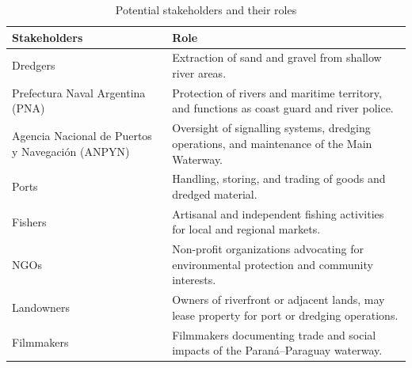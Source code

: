 \begin{table}[H]
\centering
\caption{Potential stakeholders and their roles}
\begin{tabularx}{\linewidth}{p{3.5cm}X} %
\toprule
Stakeholders & Role \\
\midrule
Dredgers & Extraction of sand and gravel from shallow river areas. \\
Prefectura Naval Argentina (PNA) & Protection of rivers and maritime territory, and functions as coast guard and river police. \\
Agencia Nacional de Puertos y Navegación (ANPYN) & Oversight of signalling systems, dredging operations, and maintenance of the Main Waterway. \\
Ports & Handling, storing, and trading of goods and dredged material. \\
Fishers & Artisanal and independent fishing activities for local and regional markets. \\
NGOs & Non-profit organizations advocating for environmental protection and community interests. \\
Landowners & Owners of riverfront or adjacent lands, may lease property for port or dredging operations. \\
Filmmakers & Filmmakers documenting trade and social impacts of the Paraná–Paraguay waterway. \\
\bottomrule
\end{tabularx}

\label{tab:stakeholders}
\end{table}



